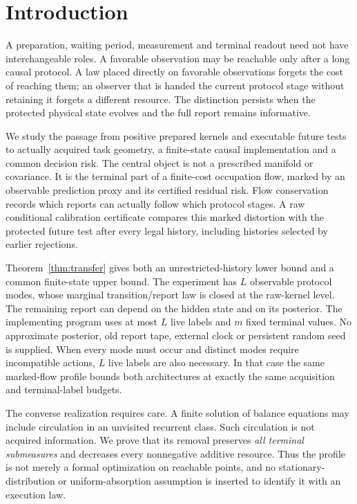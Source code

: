 \section{Introduction}
A preparation, waiting period, measurement and terminal readout need not have interchangeable roles. A favorable observation may be reachable only after a long causal protocol. A law placed directly on favorable observations forgets the cost of reaching them; an observer that is handed the current protocol stage without retaining it forgets a different resource. The distinction persists when the protected physical state evolves and the full report remains informative.

We study the passage from positive prepared kernels and executable future tests to actually acquired task geometry, a finite-state causal implementation and a common decision risk. The central object is not a prescribed manifold or covariance. It is the terminal part of a finite-cost occupation flow, marked by an observable prediction proxy and its certified residual risk. Flow conservation records which reports can actually follow which protocol stages. A raw conditional calibration certificate compares this marked distortion with the protected future test after every legal history, including histories selected by earlier rejections.

Theorem~\ref{thm:transfer} gives both an unrestricted-history lower bound and a common finite-state upper bound. The experiment has $L$ observable protocol modes, whose marginal transition/report law is closed at the raw-kernel level. The remaining report can depend on the hidden state and on its posterior. The implementing program uses at most $L$ live labels and $m$ fixed terminal values. No approximate posterior, old report tape, external clock or persistent random seed is supplied. When every mode must occur and distinct modes require incompatible actions, $L$ live labels are also necessary. In that case the same marked-flow profile bounds both architectures at exactly the same acquisition and terminal-label budgets.

The converse realization requires care. A finite solution of balance equations may include circulation in an unvisited recurrent class. Such circulation is not acquired information. We prove that its removal preserves \emph{all terminal submeasures} and decreases every nonnegative additive resource. Thus the profile is not merely a formal optimization on reachable points, and no stationary-distribution or uniform-absorption assumption is inserted to identify it with an execution law.

